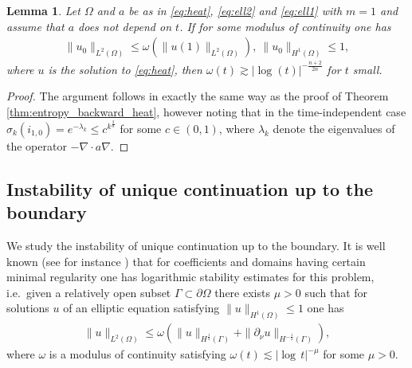 \documentclass[12pt,twoside]{amsart}
\numberwithin{equation}{section}
\renewcommand{\leq}{\leqslant}
\newtheorem{lemma}[theorem]{Lemma}
\newcommand {\p} {\partial}
\newcommand{\abs}[1]{\lvert #1 \rvert}          %
\newcommand{\norm}[1]{\lVert #1 \rVert}         %
\begin{document}
\begin{lemma}
\label{lem:heat_time_indep}
Let $\Omega$ and $a$ be as in \eqref{eq:heat}, \eqref{eq:ell2} and \eqref{eq:ell1} with $m=1$ and assume that $a$ does not depend on $t$. If for some modulus of continuity one has
\begin{align*}
\|u_0\|_{L^2(\Omega)} \leq \omega(\|u(1)\|_{L^2(\Omega)}), \ \|u_0\|_{H^1(\Omega)}\leq 1,
\end{align*}
where $u$ is the solution to \eqref{eq:heat}, then $\omega(t)\gtrsim |\log(t)|^{- \frac{n+2}{2n}}$ for $t$ small.
\end{lemma} 

\begin{proof}
The argument follows in exactly the same way as the proof of Theorem \ref{thm:entropy_backward_heat}, however noting that in the time-independent case $\sigma_k(i_{1,0}) = e^{-\lambda_k}\leq c^{k^{\frac{2}{n}}}$ for some $c\in (0,1)$, where $\lambda_k$ denote the eigenvalues of the operator $-\nabla \cdot a \nabla$. 
\end{proof}


\subsection{Instability of unique continuation up to the boundary}
\label{sec:UCP}
We study the instability of unique continuation up to the boundary. It is well known (see for instance \cite[Theorem 1.9]{AlessandriniRondiRossetVessella}) that for coefficients and domains having certain minimal regularity one has logarithmic stability estimates for this problem, i.e.\ given a relatively open subset $\Gamma \subset \partial\Omega$ there exists $\mu>0$ such that for solutions $u$ of an elliptic equation satisfying $\norm{u}_{H^1(\Omega)} \leq 1$ one has  
\begin{align*}
\|u\|_{L^2(\Omega)} \leq \omega(\|u\|_{H^{\frac{1}{2}}(\Gamma)} + \|\p_{\nu} u\|_{H^{-\frac{1}{2}}(\Gamma)}),
\end{align*}
where $\omega$ is a modulus of continuity satisfying $\omega(t) \lesssim \abs{\log\,t}^{-\mu}$ for some $\mu > 0$.
\end{document}
